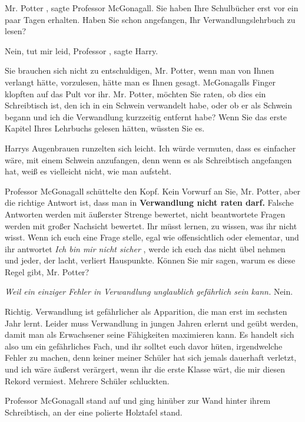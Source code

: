 \glqq Mr. Potter\grqq{} , sagte Professor McGonagall. \glqq Sie haben Ihre
Schulbücher erst vor ein paar Tagen erhalten. Haben Sie schon angefangen, Ihr
Verwandlungslehrbuch zu lesen?\grqq{}

\glqq Nein, tut mir leid, Professor\grqq{} , sagte Harry.

\glqq Sie brauchen sich nicht zu entschuldigen, Mr. Potter, wenn man von Ihnen
verlangt hätte, vorzulesen, hätte man es Ihnen gesagt.\grqq{} McGonagalls Finger
klopften auf das Pult vor ihr. \glqq Mr. Potter, möchten Sie raten, ob dies ein
Schreibtisch ist, den ich in ein Schwein verwandelt habe, oder ob er als Schwein
begann und ich die Verwandlung kurzzeitig entfernt habe? Wenn Sie das erste
Kapitel Ihres Lehrbuchs gelesen hätten, wüssten Sie es.\grqq{}

Harrys Augenbrauen runzelten sich leicht. \glqq Ich würde vermuten, dass es
einfacher wäre, mit einem Schwein anzufangen, denn wenn es als Schreibtisch
angefangen hat, weiß es vielleicht nicht, wie man aufsteht.\grqq{}

Professor McGonagall schüttelte den Kopf. \glqq Kein Vorwurf an Sie, Mr. Potter,
aber die richtige Antwort ist, dass man in \textbf{Verwandlung nicht raten
darf.} Falsche Antworten werden mit äußerster Strenge bewertet, nicht
beantwortete Fragen werden mit großer Nachsicht bewertet. Ihr müsst lernen, zu
wissen, was ihr nicht wisst. Wenn ich euch eine Frage stelle, egal wie
offensichtlich oder elementar, und ihr antwortet \emph{\glqq Ich bin mir nicht
sicher\grqq{} }, werde ich euch das nicht übel nehmen und jeder, der lacht,
verliert Hauspunkte. Können Sie mir sagen, warum es diese Regel gibt, Mr.
Potter?\grqq{}

\emph{Weil ein einziger Fehler in Verwandlung unglaublich gefährlich sein kann.}
\glqq Nein.\grqq{}

\glqq Richtig. Verwandlung ist gefährlicher als Apparition, die man erst im
sechsten Jahr lernt. Leider muss Verwandlung in jungen Jahren erlernt und geübt
werden, damit man als Erwachsener seine Fähigkeiten maximieren kann. Es handelt
sich also um ein gefährliches Fach, und ihr solltet euch davor hüten,
irgendwelche Fehler zu machen, denn keiner meiner Schüler hat sich jemals
dauerhaft verletzt, und ich wäre äußerst verärgert, wenn ihr die erste Klasse
wärt, die mir diesen Rekord vermiest.\grqq{} Mehrere Schüler schluckten.

Professor McGonagall stand auf und ging hinüber zur Wand hinter ihrem
Schreibtisch, an der eine polierte Holztafel stand.

